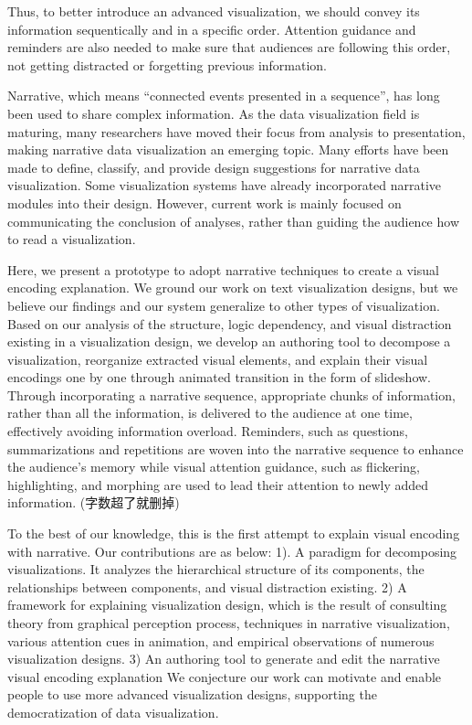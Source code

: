 Thus, to better introduce an advanced visualization, we should convey its information sequentically and in a specific order. Attention guidance and reminders are also needed to make sure that audiences are following this order, not getting distracted or forgetting previous information.

Narrative, which means “connected events presented in a sequence”, has long been used to share complex information. \cite{schmidt_living_2017}As the data visualization field is maturing, many researchers have moved their focus from analysis to presentation, making narrative data visualization an emerging topic\cite{kosara_storytelling:_2013}. Many efforts have been
made to define, classify, and provide design suggestions for narrative data visualization\cite{segel_narrative_2010,hullman_deeper_2013,gershon_what_2001}. Some visualization systems have already incorporated narrative modules into their design\cite{eccles_stories_2007,bryan_temporal_2016}. However, current work is mainly focused on communicating the conclusion of analyses, rather than guiding the audience how to read a visualization. 

Here, we present a prototype to adopt narrative techniques to create a visual encoding explanation. We
ground our work on text visualization designs, but we believe our findings and our system generalize to other types of visualization. Based on our analysis of the structure, logic dependency, and visual distraction existing in a visualization design, we develop an authoring tool to decompose a visualization, reorganize extracted visual elements, and explain their visual encodings one by one through animated transition in the form of slideshow. Through incorporating a narrative sequence, appropriate chunks of information, rather than all the information, is delivered to the audience at one time, effectively avoiding information overload. Reminders, such as questions, summarizations and repetitions are woven into the narrative sequence to enhance the audience’s memory while visual attention guidance, such as flickering, highlighting, and morphing are used to lead their attention to newly added information. (字数超了就删掉)

To the best of our knowledge, this is the first attempt to explain visual encoding with narrative. Our contributions are as below: 1). A paradigm for decomposing visualizations. It analyzes the hierarchical structure of its components, the relationships between components, and visual distraction existing. 2) A framework for explaining visualization design, which is the result of consulting theory from graphical perception process, techniques in narrative visualization, various attention cues in animation, and empirical observations of numerous visualization designs. 3) An authoring tool to generate and edit the narrative visual encoding explanation
 We conjecture our work can motivate and enable people to use more advanced visualization designs, supporting the democratization of data visualization.
 